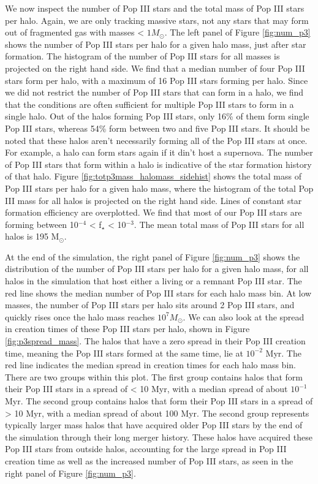 \documentclass[a4paper,fleqn,usenatbib]{mnras}
\begin{document}
We now inspect the number of Pop III stars and the total mass of Pop III stars per halo. Again, we are only tracking massive stars, not any stars that may form out of fragmented gas with masses < $1 M_{\odot}$. The left panel of Figure \ref{fig:num_p3} shows the number of Pop III stars per halo for a given halo mass, just after star formation. The histogram of the number of Pop III stars for all masses is projected on the right hand side. We find that a median number of four Pop III stars form per halo, with a maximum of 16 Pop III stars forming per halo. Since we did not restrict the number of Pop III stars that can form in a halo, we find that the conditions are often sufficient for multiple Pop III stars to form in a single halo. Out of the halos forming Pop III stars, only 16\% of them form single Pop III stars, whereas 54\% form between two and five Pop III stars. It should be noted that these halos aren't necessarily forming all of the Pop III stars at once. For example, a halo can form stars again if it din't host a supernova. The number of Pop III stars that form within a halo is indicative of the star formation history of that halo. Figure \ref{fig:totp3mass_halomass_sidehist} shows the total mass of Pop III stars per halo for a given halo mass, where the histogram of the total Pop III mass for all halos is projected on the right hand side. Lines of constant star formation efficiency are overplotted. We find that most of our Pop III stars are forming between 10$^{-4}$ < f$_\star$ < 10$^{-3}$. The mean total mass of Pop III stars for all halos is 195 M$_{\odot}$.  

At the end of the simulation, the right panel of Figure \ref{fig:num_p3} shows the distribution of the number of Pop III stars per halo for a given halo mass, for all halos in the simulation that host either a living or a remnant Pop III star. The red line shows the median number of Pop III stars for each halo mass bin. At low masses, the number of Pop III stars per halo sits around 2 Pop III stars, and quickly rises once the halo mass reaches $10^{7} M_{\odot}$. We can also look at the spread in creation times of these Pop III stars per halo, shown in Figure \ref{fig:p3spread_mass}. The halos that have a zero spread in their Pop III creation time, meaning the Pop III stars formed at the same time, lie at $10^{-2}$ Myr. The red line indicates the median spread in creation times for each halo mass bin. There are two groups within this plot. The first group contains halos that form their Pop III stars in a spread of < 10 Myr, with a median spread of about $10^{-1}$ Myr. The second group contains halos that form their Pop III stars in a spread of > 10 Myr, with a median spread of about 100 Myr. The second group represents typically larger mass halos that have acquired older Pop III stars by the end of the simulation through their long merger history. These halos have acquired these Pop III stars from outside halos, accounting for the large spread in Pop III creation time as well as the increased number of Pop III stars, as seen in the right panel of Figure \ref{fig:num_p3}. 
\end{document}

